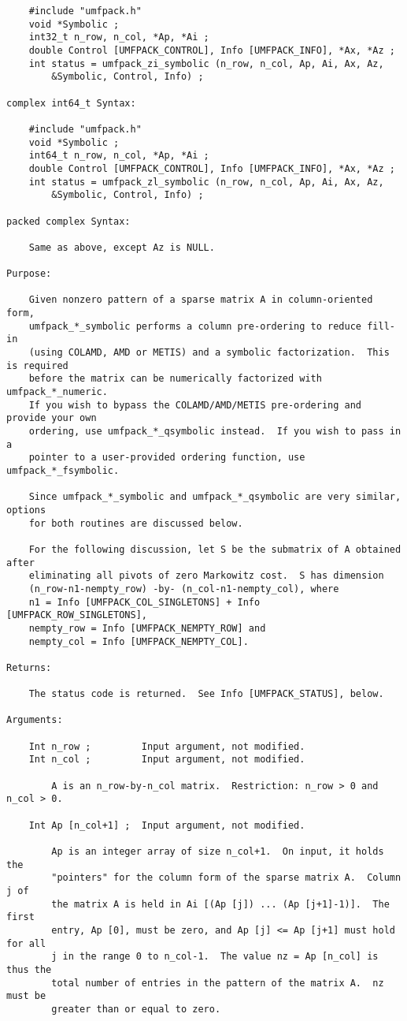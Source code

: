 \documentclass[11pt]{article}
\begin{document}
{\begin{verbatim}
    #include "umfpack.h"
    void *Symbolic ;
    int32_t n_row, n_col, *Ap, *Ai ;
    double Control [UMFPACK_CONTROL], Info [UMFPACK_INFO], *Ax, *Az ;
    int status = umfpack_zi_symbolic (n_row, n_col, Ap, Ai, Ax, Az,
        &Symbolic, Control, Info) ;

complex int64_t Syntax:

    #include "umfpack.h"
    void *Symbolic ;
    int64_t n_row, n_col, *Ap, *Ai ;
    double Control [UMFPACK_CONTROL], Info [UMFPACK_INFO], *Ax, *Az ;
    int status = umfpack_zl_symbolic (n_row, n_col, Ap, Ai, Ax, Az,
        &Symbolic, Control, Info) ;

packed complex Syntax:

    Same as above, except Az is NULL.

Purpose:

    Given nonzero pattern of a sparse matrix A in column-oriented form,
    umfpack_*_symbolic performs a column pre-ordering to reduce fill-in
    (using COLAMD, AMD or METIS) and a symbolic factorization.  This is required
    before the matrix can be numerically factorized with umfpack_*_numeric.
    If you wish to bypass the COLAMD/AMD/METIS pre-ordering and provide your own
    ordering, use umfpack_*_qsymbolic instead.  If you wish to pass in a
    pointer to a user-provided ordering function, use umfpack_*_fsymbolic.

    Since umfpack_*_symbolic and umfpack_*_qsymbolic are very similar, options
    for both routines are discussed below.

    For the following discussion, let S be the submatrix of A obtained after
    eliminating all pivots of zero Markowitz cost.  S has dimension
    (n_row-n1-nempty_row) -by- (n_col-n1-nempty_col), where
    n1 = Info [UMFPACK_COL_SINGLETONS] + Info [UMFPACK_ROW_SINGLETONS],
    nempty_row = Info [UMFPACK_NEMPTY_ROW] and
    nempty_col = Info [UMFPACK_NEMPTY_COL].

Returns:

    The status code is returned.  See Info [UMFPACK_STATUS], below.

Arguments:

    Int n_row ;         Input argument, not modified.
    Int n_col ;         Input argument, not modified.

        A is an n_row-by-n_col matrix.  Restriction: n_row > 0 and n_col > 0.

    Int Ap [n_col+1] ;  Input argument, not modified.

        Ap is an integer array of size n_col+1.  On input, it holds the
        "pointers" for the column form of the sparse matrix A.  Column j of
        the matrix A is held in Ai [(Ap [j]) ... (Ap [j+1]-1)].  The first
        entry, Ap [0], must be zero, and Ap [j] <= Ap [j+1] must hold for all
        j in the range 0 to n_col-1.  The value nz = Ap [n_col] is thus the
        total number of entries in the pattern of the matrix A.  nz must be
        greater than or equal to zero.


\end{verbatim}}
\end{document}
